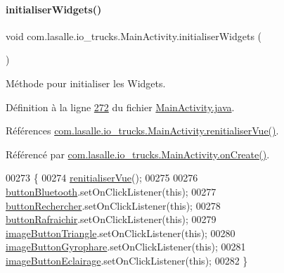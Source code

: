 \paragraph{\texorpdfstring{initialiser\+Widgets()}{initialiserWidgets()}}
{\footnotesize\ttfamily void com.\+lasalle.\+io\+\_\+trucks.\+Main\+Activity.\+initialiser\+Widgets (\begin{DoxyParamCaption}{ }\end{DoxyParamCaption})\hspace{0.3cm}{\ttfamily [private]}}



Méthode pour initialiser les Widgets. 



Définition à la ligne \hyperlink{_main_activity_8java_source_l00272}{272} du fichier \hyperlink{_main_activity_8java_source}{Main\+Activity.\+java}.



Références \hyperlink{_main_activity_8java_source_l00307}{com.\+lasalle.\+io\+\_\+trucks.\+Main\+Activity.\+renitialiser\+Vue()}.



Référencé par \hyperlink{_main_activity_8java_source_l00059}{com.\+lasalle.\+io\+\_\+trucks.\+Main\+Activity.\+on\+Create()}.


\begin{DoxyCode}
00273     \{
00274         \hyperlink{classcom_1_1lasalle_1_1io__trucks_1_1_main_activity_ac4c0bdaf761a42e924c6cf9d1b9a0e23}{renitialiserVue}();
00275 
00276         \hyperlink{classcom_1_1lasalle_1_1io__trucks_1_1_main_activity_a2197b0145db353437c41d1fc57f28650}{buttonBluetooth}.setOnClickListener(\textcolor{keyword}{this});
00277         \hyperlink{classcom_1_1lasalle_1_1io__trucks_1_1_main_activity_a74b2f440caeb7d27d9bd62d87f106156}{buttonRechercher}.setOnClickListener(\textcolor{keyword}{this});
00278         \hyperlink{classcom_1_1lasalle_1_1io__trucks_1_1_main_activity_ac138932ce8d8dd12d7eb35496a1c9a16}{buttonRafraichir}.setOnClickListener(\textcolor{keyword}{this});
00279         \hyperlink{classcom_1_1lasalle_1_1io__trucks_1_1_main_activity_abe65c5762df1b63ee18b51fcb1bb23c8}{imageButtonTriangle}.setOnClickListener(\textcolor{keyword}{this});
00280         \hyperlink{classcom_1_1lasalle_1_1io__trucks_1_1_main_activity_aed3dc707e8acf48e821ebda3312a0dca}{imageButtonGyrophare}.setOnClickListener(\textcolor{keyword}{this});
00281         \hyperlink{classcom_1_1lasalle_1_1io__trucks_1_1_main_activity_a1cc3f48aebca6c187b2a964fa6f569fc}{imageButtonEclairage}.setOnClickListener(\textcolor{keyword}{this});
00282     \}
\end{DoxyCode}
\mbox{\label{classcom_1_1lasalle_1_1io__trucks_1_1_main_activity_a154e0d879d71bfbe95bc2d566517589d}} 
